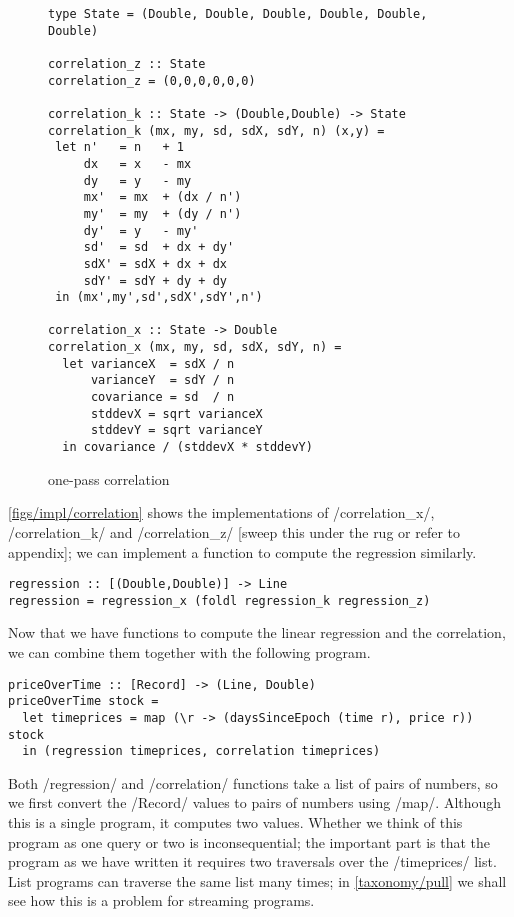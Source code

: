 \begin{figure}
\begin{lstlisting}
type State = (Double, Double, Double, Double, Double, Double)

correlation_z :: State
correlation_z = (0,0,0,0,0,0)

correlation_k :: State -> (Double,Double) -> State
correlation_k (mx, my, sd, sdX, sdY, n) (x,y) =
 let n'   = n   + 1
     dx   = x   - mx
     dy   = y   - my
     mx'  = mx  + (dx / n')
     my'  = my  + (dy / n')
     dy'  = y   - my'
     sd'  = sd  + dx + dy'
     sdX' = sdX + dx + dx
     sdY' = sdY + dy + dy
 in (mx',my',sd',sdX',sdY',n')

correlation_x :: State -> Double
correlation_x (mx, my, sd, sdX, sdY, n) =
  let varianceX  = sdX / n
      varianceY  = sdY / n
      covariance = sd  / n
      stddevX = sqrt varianceX
      stddevY = sqrt varianceY
  in covariance / (stddevX * stddevY)
\end{lstlisting}
\caption[One-pass correlation]{one-pass correlation }
\label{figs/impl/correlation}
\end{figure}

\autoref{figs/impl/correlation} shows the implementations of \Hs/correlation_x/, \Hs/correlation_k/ and \Hs/correlation_z/ [sweep this under the rug or refer to appendix]; we can implement a function to compute the regression similarly.

\begin{lstlisting}
regression :: [(Double,Double)] -> Line
regression = regression_x (foldl regression_k regression_z)
\end{lstlisting}

Now that we have functions to compute the linear regression and the correlation, we can combine them together with the following program.

\begin{lstlisting}
priceOverTime :: [Record] -> (Line, Double)
priceOverTime stock =
  let timeprices = map (\r -> (daysSinceEpoch (time r), price r)) stock
  in (regression timeprices, correlation timeprices)
\end{lstlisting}

Both \Hs/regression/ and \Hs/correlation/ functions take a list of pairs of numbers, so we first convert the \Hs/Record/ values to pairs of numbers using \Hs/map/.
Although this is a single program, it computes two values.
Whether we think of this program as one query or two is inconsequential; the important part is that the program as we have written it requires two traversals over the \Hs/timeprices/ list.
List programs can traverse the same list many times; in \autoref{taxonomy/pull} we shall see how this is a problem for streaming programs.

